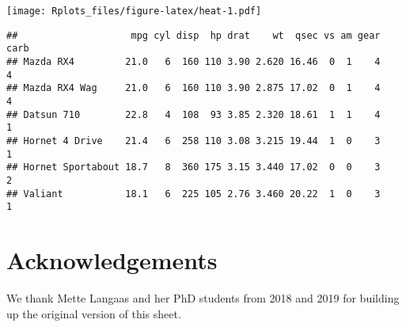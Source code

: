 \documentclass[]{article}
\begin{document}
\texttt{[image: Rplots\_files/figure-latex/heat-1.pdf]}

\begin{verbatim}
##                    mpg cyl disp  hp drat    wt  qsec vs am gear carb
## Mazda RX4         21.0   6  160 110 3.90 2.620 16.46  0  1    4    4
## Mazda RX4 Wag     21.0   6  160 110 3.90 2.875 17.02  0  1    4    4
## Datsun 710        22.8   4  108  93 3.85 2.320 18.61  1  1    4    1
## Hornet 4 Drive    21.4   6  258 110 3.08 3.215 19.44  1  0    3    1
## Hornet Sportabout 18.7   8  360 175 3.15 3.440 17.02  0  0    3    2
## Valiant           18.1   6  225 105 2.76 3.460 20.22  1  0    3    1
\end{verbatim}

\section{Acknowledgements}\label{acknowledgements}

We thank Mette Langaas and her PhD students from 2018 and 2019 for
building up the original version of this sheet.
\end{document}
